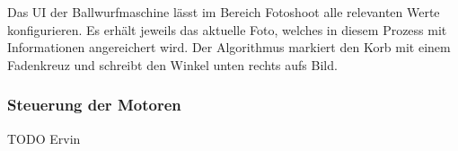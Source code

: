 Das UI der Ballwurfmaschine lässt im Bereich Fotoshoot alle relevanten Werte konfigurieren. Es erhält jeweils das aktuelle Foto, welches in diesem Prozess mit Informationen angereichert wird. Der Algorithmus markiert den Korb mit einem Fadenkreuz und schreibt den Winkel unten rechts aufs Bild.

\subsubsection{Steuerung der Motoren}
TODO Ervin